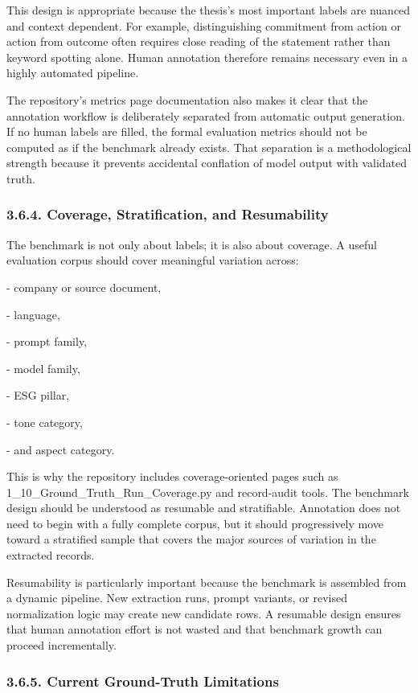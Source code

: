 \documentclass{article}
\begin{document}
This design is appropriate because the thesis’s most important labels are nuanced and context dependent. For example, distinguishing commitment from action or action from outcome often requires close reading of the statement rather than keyword spotting alone. Human annotation therefore remains necessary even in a highly automated pipeline.

The repository’s metrics page documentation also makes it clear that the annotation workflow is deliberately separated from automatic output generation. If no human labels are filled, the formal evaluation metrics should not be computed as if the benchmark already exists. That separation is a methodological strength because it prevents accidental conflation of model output with validated truth.
\subsubsection*{ 3.6.4. Coverage, Stratification, and Resumability}

The benchmark is not only about labels; it is also about coverage. A useful evaluation corpus should cover meaningful variation across:

- company or source document,

- language,

- prompt family,

- model family,

- ESG pillar,

- tone category,

- and aspect category.

This is why the repository includes coverage-oriented pages such as 1\_10\_Ground\_Truth\_Run\_Coverage.py and record-audit tools. The benchmark design should be understood as resumable and stratifiable. Annotation does not need to begin with a fully complete corpus, but it should progressively move toward a stratified sample that covers the major sources of variation in the extracted records.

Resumability is particularly important because the benchmark is assembled from a dynamic pipeline. New extraction runs, prompt variants, or revised normalization logic may create new candidate rows. A resumable design ensures that human annotation effort is not wasted and that benchmark growth can proceed incrementally.
\subsubsection*{3.6.5. Current Ground-Truth Limitations}
\end{document}

